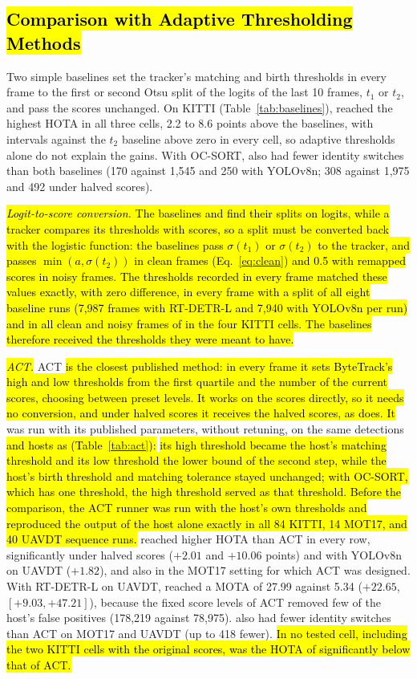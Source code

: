 \subsection[Comparison with Adaptive Thresholding Methods]{\hl{Comparison with Adaptive Thresholding Methods}}\label{sec:baselines}
Two simple baselines set the tracker's matching and birth thresholds in every frame to the first or
second Otsu split of the logits of the last 10 frames, $t_1$ or $t_2$, and pass the scores
unchanged. On KITTI (Table~\ref{tab:baselines}), \scl{} reached the highest HOTA in all three
cells, 2.2 to 8.6 points above the baselines, with intervals against the $t_2$ baseline above zero
in every cell, so adaptive thresholds alone do not explain the gains. With OC-SORT, \scl{} also had
fewer identity switches than both baselines (170 against 1,545 and 250 with YOLOv8n; 308 against
1,975 and 492 under halved scores).

\hl{\emph{Logit-to-score conversion.} The baselines and \scl{} find their splits on logits, while a
tracker compares its thresholds with scores, so a split must be converted back with the logistic
function: the baselines pass $\sigma(t_1)$ or $\sigma(t_2)$ to the tracker, and \scl{} passes
$\min(a,\sigma(t_2))$ in clean frames (Eq.~\eqref{eq:clean}) and 0.5 with remapped scores in noisy
frames. The thresholds recorded in every frame matched these values exactly, with zero difference,
in every frame with a split of all eight baseline runs (7,987 frames with RT-DETR-L and 7,940
with YOLOv8n per run) and in all clean and noisy frames of \scl{} in the four KITTI cells. The baselines therefore received the thresholds they were meant to have.}

\hl{\emph{ACT.}} ACT \cite{act2026adaptive} \hl{is the closest published method: in every frame it sets
ByteTrack's high and low thresholds from the first quartile and the number of the current scores,
choosing between preset levels. It works on the scores directly, so it needs no conversion, and
under halved scores it receives the halved scores, as \scl{} does. It} was run with its published
parameters, without retuning, on the same detections \hl{and hosts as \scl{} (Table~\ref{tab:act}):}
\hl{its high threshold became the host's matching threshold and its low threshold the lower bound of
the second step, while the host's birth threshold and matching tolerance stayed unchanged; with
OC-SORT, which has one threshold, the high threshold served as that threshold. Before the
comparison, the ACT runner was run with the host's own thresholds and reproduced the output of the
host alone exactly in all 84 KITTI, 14 MOT17, and 40 UAVDT sequence runs.} \scl{} reached higher HOTA
than ACT in every row, significantly under halved
scores ($+2.01$ and $+10.06$ points) and with YOLOv8n on UAVDT ($+1.82$), and also in the MOT17
setting for which ACT was designed. With RT-DETR-L on UAVDT, \scl{} reached a MOTA of 27.99 against
5.34 ($+22.65$, $[+9.03,+47.21]$), because the fixed score levels of ACT removed few of the host's
false positives (178,219 against 78,975). \scl{} also had fewer identity switches than ACT on
MOT17 and UAVDT (up to 418 fewer). \hl{In no tested cell, including the two KITTI cells with the
original scores, was the HOTA of \scl{} significantly below that of ACT.}

